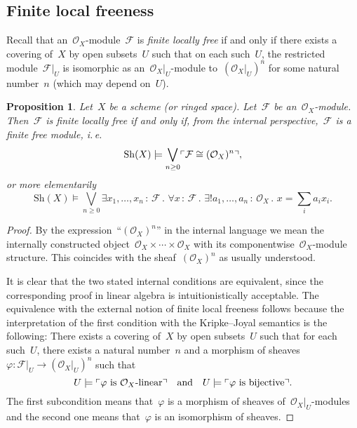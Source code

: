 \documentclass[10pt]{amsart}
\makeatletter
\theoremstyle{definition}
\theoremstyle{plain}
\newtheorem{prop}[defn]{Proposition}
\theoremstyle{remark}
\newcommand{\F}{\mathcal{F}}
\renewcommand{\O}{\mathcal{O}}
\newcommand{\Sh}{\mathrm{Sh}}
\newcommand{\?}{\,{:}\,}
\renewcommand{\_}{\mathpunct{.}\,}
\newcommand{\speak}[1]{\ulcorner\text{\textnormal{#1}}\urcorner}
\newcommand{\ie}{i.\,e.\@\xspace}
\makeatother
\begin{document}


\subsection{Finite local freeness}

Recall that an~$\O_X$-module~$\F$ is \emph{finite locally free} if and only
if there exists a covering of~$X$ by open subsets~$U$ such that on each
such~$U$, the restricted module~$\F|_U$ is isomorphic as an~$\O_X|_U$-module
to~$(\O_X|_U)^n$ for some natural number~$n$ (which may depend on~$U$).

\begin{prop}\label{prop:locally-free}
Let~$X$ be a scheme (or ringed space). Let~$\F$ be
an~$\O_X$-module. Then~$\F$ is finite locally free if and only if, from the
internal perspective,~$\F$ is a finite free module, \ie
\[ \Sh(X) \models \bigvee_{n \geq 0} \speak{$\F \cong (\O_X)^n$}, \]
or more elementarily
\[ \Sh(X) \models \bigvee_{n \geq 0}
  \exists x_1,\ldots,x_n\?\F\_
  \forall x\?\F\_
  \exists! a_1,\ldots,a_n\?\O_X\_
  x = \textstyle\sum\limits_i a_i x_i. \]
\end{prop}
\begin{proof}By the expression~``$(\O_X)^n$'' in the internal language we mean
the internally constructed object~$\O_X \times \cdots \times \O_X$ with its
componentwise~$\O_X$-module structure. This coincides with the sheaf~$(\O_X)^n$ as
usually understood.

It is clear that the two stated internal conditions are equivalent, since the
corresponding proof in linear algebra is intuitionistically acceptable. The equivalence with
the external notion of finite local freeness follows because the
interpretation of the first condition with the Kripke--Joyal semantics is the
following: There exists a covering of~$X$ by open subsets~$U$ such that for
each such~$U$, there exists a natural number~$n$ and a morphism of
sheaves~$\varphi : \F|_U \to (\O_X|_U)^n$ such that
\[ U \models \speak{$\varphi$ is~$\O_X$-linear} \quad\text{and}\quad
  U \models \speak{$\varphi$ is bijective}. \]
The first subcondition means that~$\varphi$ is a morphism of sheaves
of~$\O_X|_U$-modules and the second one means that~$\varphi$ is an isomorphism of
sheaves.
\end{proof}
\end{document}
